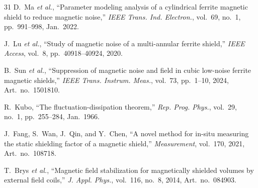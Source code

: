 \documentclass[letterpaper,journal]{IEEEtran}
\begin{document}
\begin{thebibliography}{31}
D.~Ma \textit{et al.},
``Parameter modeling analysis of a cylindrical ferrite magnetic shield to reduce magnetic noise,''
\textit{IEEE Trans. Ind. Electron.}, vol.~69, no.~1, pp.~991--998, Jan.~2022.

J.~Lu \textit{et al.},
``Study of magnetic noise of a multi-annular ferrite shield,''
\textit{IEEE Access}, vol.~8, pp.~40918--40924, 2020.

B.~Sun \textit{et al.},
``Suppression of magnetic noise and field in cubic low-noise ferrite magnetic shields,''
\textit{IEEE Trans. Instrum. Meas.}, vol.~73, pp.~1--10, 2024, Art.~no.~1501810.

R.~Kubo,
``The fluctuation-dissipation theorem,''
\textit{Rep. Prog. Phys.}, vol.~29, no.~1, pp.~255--284, Jan.~1966.

J.~Fang, S.~Wan, J.~Qin, and Y.~Chen,
``A novel method for in-situ measuring the static shielding factor of a magnetic shield,''
\textit{Measurement}, vol.~170, 2021, Art.~no.~108718.

T.~Brys \textit{et al.},
``Magnetic field stabilization for magnetically shielded volumes by external field coils,''
\textit{J. Appl. Phys.}, vol.~116, no.~8, 2014, Art.~no.~084903.

\end{thebibliography}
\end{document}

